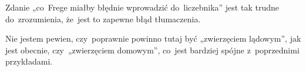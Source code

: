 \documentclass[a4paper,11pt]{article}
\numberwithin{equation}{section}
\begin{document}
\noindent
{} Zdanie „co~Frege miałby błędnie wprowadzić
do~liczebnika” jest tak trudne do~zrozumienia, że~jest to zapewne błąd
tłumaczenia.

\VerSpaceFour





\noindent
{} Nie jestem pewien, czy~poprawnie powinno tutaj
być „zwierzęciem lądowym”, jak jest obecnie, czy~„zwierzęciem
domowym”, co~jest bardziej spójne z~poprzednimi przykładami.

\VerSpaceFour





\newpage



\begin{center}


\end{center}
\end{document}
